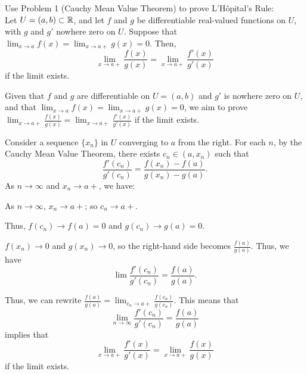 \begin{problem}
  Use Problem 1 (Cauchy Mean Value Theorem) to prove
  L'H\^{o}pital's Rule: \\
  Let $U = (a, b) \subset \mathbb{R}$, and let $f$ and $g$ be differentiable
  real-valued functions on $U$, with $g$ and $g'$ nowhere zero on $U$.
  Suppose that
  $\displaystyle \lim_{x \to a} f(x) = \lim_{x \to a+} g(x) = 0$.
  Then, \[ \lim_{x \to a+} \frac{f(x)}{g(x)} = \lim_{x \to a+} \frac{f'(x)}{g'(x)} \]
  if the limit exists.
\end{problem}

\begin{answer}
  Given that \( f \) and \( g \) are differentiable on \( U = (a, b) \) and \( g' \)
  is nowhere zero on \( U \), and that \( \displaystyle \lim_{x \to a} f(x) = \lim_{x \to a+} g(x) = 0 \),
  we aim to prove \( \displaystyle \lim_{x \to a+} \frac{f(x)}{g(x)} = \lim_{x \to a+} \frac{f'(x)}{g'(x)} \)
  if the limit exists.

  Consider a sequence \( \{x_n\} \) in \( U \) converging to \( a \) from the right.
  For each \( n \), by the Cauchy Mean Value Theorem, there exists \( c_n \in (a, x_n) \) such that
  \[ \frac{f'(c_n)}{g'(c_n)} = \frac{f(x_n) - f(a)}{g(x_n) - g(a)}. \]
  As $n \to \infty$ and $x_n \to a+$, we have:
  \begin{enumroman}
    \item As $n \to \infty$, $x_n \to a+$; so $c_n \to a+$.
    \item Thus, $f(c_n) \to f(a) = 0$ and $g(c_n) \to g(a) = 0$.
  \end{enumroman}
  
  \( f(x_n) \to 0 \) and \( g(x_n) \to 0 \),
  so the right-hand side becomes \( \displaystyle \frac{f(a)}{g(a)} \).
  Thus, we have \[ \lim_{}\frac{f'(c_n)}{g'(c_n)} = \frac{f(a)}{g(a)}. \]

  \step
  Thus, we can rewrite $\displaystyle \frac{f(a)}{g(a)} = \lim_{c_n \to a+} \frac{f(c_n)}{g(c_n)}$.
  This means that
  \[ \lim_{n \to \infty} \frac{f'(c_n)}{g'(c_n)} = \frac{f(a)}{g(a)} \]
  implies that
  \[ \lim_{x \to a+} \frac{f'(x)}{g'(x)} = \lim_{x \to a+} \frac{f(x)}{g(x)} \]
  if the limit exists.
\end{answer}
